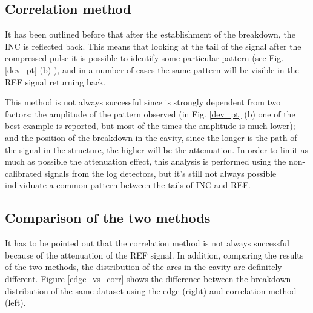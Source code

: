 \subsection[Correlation method]{Correlation method}

It has been outlined before that after the establishment of the breakdown, the INC is reflected back. This means that looking at the tail of the signal after the compressed pulse it is possible to identify some particular pattern (see Fig. \ref{dev_pt} (b) ), and in a number of cases the same pattern will be visible in the REF signal returning back. 

This method is not always successful since is strongly dependent from two factors: the amplitude of the pattern observed (in Fig. \ref{dev_pt} (b) one of the best example is reported, but most of the times the amplitude is much lower); and the position of the breakdown in the cavity, since the longer is the path of the signal in the structure, the higher will be the attenuation. In order to limit as much as possible the attenuation effect, this analysis is performed using the non-calibrated signals from the log detectors, but it's still not always possible individuate a common pattern between the tails of INC and REF.


\subsection[Comparison of the two methods]{Comparison of the two methods}

It has to be pointed out that the correlation method is not always successful because of the attenuation of the REF signal. In addition, comparing the results of the two methods, the distribution of the arcs in the cavity are definitely different. Figure \ref{edge_vs_corr} shows the difference between the breakdown distribution of the same dataset using the edge (right) and correlation method (left). 


